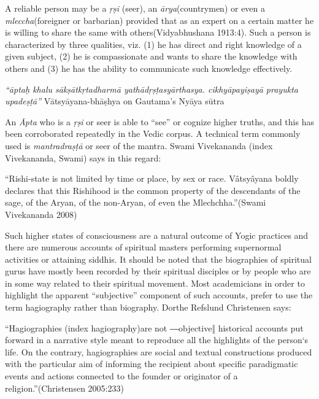 A reliable person may be a \textit{ṛṣi} (seer), an \textit{ārya}(countrymen) or even a \textit{mleccha}(foreigner or barbarian) provided that as an expert on a certain matter he is willing to share the same with others(Vidyabhushana 1913:4). Such a person is characterized by three qualities, viz. (1) he has direct and right knowledge of a given subject, (2) he is compassionate and wants to share the knowledge with others and (3) he has the ability to communicate such knowledge effectively.

\begin{myquote}
\textit{“āptaḥ khalu sākṣātkṛtadharmā yathādṛṣṭasyārthasya. cikhyāpayiṣayā prayukta upadeṣṭā”} Vātsyāyana-bhāṣhya on Gautama’s Nyāya sūtra
\end{myquote}

An \textit{Āpta} who is a \textit{ṛṣi} or seer is able to “see” or cognize higher truths, and this has been corroborated repeatedly in the Vedic corpus. A technical term commonly used is \textit{mantradraṣṭā} or seer of the mantra. Swami Vivekananda (index Vivekananda, Swami) says in this regard:

\begin{myquote}
“Rishi-state is not limited by time or place, by sex or race. Vâtsyâyana boldly declares that this Rishihood is the common property of the descendants of the sage, of the Aryan, of the non-Aryan, of even the Mlechchha.”(Swami Vivekananda 2008)
\end{myquote}

Such higher states of consciousness are a natural outcome of Yogic practices and there are numerous accounts of spiritual masters performing supernormal activities or attaining siddhis. It should be noted that the biographies of spiritual gurus have mostly been recorded by their spiritual disciples or by people who are in some way related to their spiritual movement. Most academicians in order to highlight the apparent “subjective” component of such accounts, prefer to use the term hagiography rather than biography. Dorthe Refslund Christensen says:

\begin{myquote}
“Hagiographies (index hagiography)are not ―objective‖ historical accounts put forward in a narrative style meant to reproduce all the highlights of the person‘s life. On the contrary, hagiographies are social and textual constructions produced with the particular aim of informing the recipient about specific paradigmatic events and actions connected to the founder or originator of a religion.”(Christensen 2005:233)
\end{myquote}

